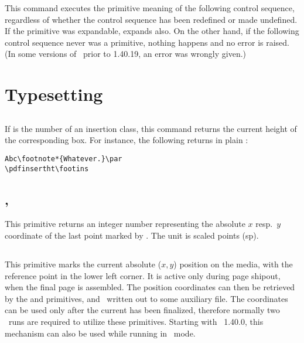 \documentclass{pdftexmanual}
\begin{document}
This command executes the primitive meaning of the following control
sequence, regardless of whether the control sequence has been redefined
or made undefined. If the primitive was expandable, 
expands also. On the other hand, if the following control sequence never
was a primitive, nothing happens and no error is raised. (In some
versions of \PDFTEX\ prior to 1.40.19, an error was wrongly given.)

\section{Typesetting}

\subsection{}

If  is the number of an insertion class, this command
returns the current height of the corresponding box. For instance, the
following returns \type{12pt} in plain \TEX:

\begin{verbatim}
Abc\footnote*{Whatever.}\par
\pdfinsertht\footins
\end{verbatim}

\subsection{, }

This primitive returns an integer number representing the absolute $x$
resp.\ $y$ coordinate of the last point marked by . The
unit is scaled points (sp).

\subsection{}

This primitive marks the current absolute ($x,y$) position on the media,
with the reference point in the lower left corner. It is active only
during page shipout, when the final page is assembled. The position
coordinates can then be retrieved by the  and
 primitives, and \eg\ written out to some auxiliary
file. The coordinates can be used only after the current 
has been finalized, therefore normally two \PDFTEX\ runs are required to
utilize these primitives. Starting with \PDFTEX\ 1.40.0, this mechanism
can also be used while running in \DVI\ mode.
\end{document}
